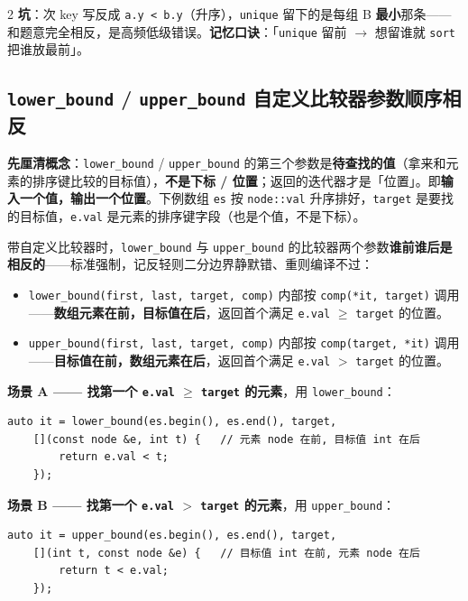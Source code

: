 \begin{multicols*}{2}
		\textbf{坑}：次 key 写反成 \texttt{a.y < b.y}（升序），\texttt{unique} 留下的是每组 B \textbf{最小}那条——和题意完全相反，是高频低级错误。\textbf{记忆口诀}：「\texttt{unique} 留前 $\to$ 想留谁就 \texttt{sort} 把谁放最前」。

		\subsection{\texttt{lower\_bound} / \texttt{upper\_bound} 自定义比较器参数顺序相反}

		\textbf{先厘清概念}：\texttt{lower\_bound} / \texttt{upper\_bound} 的第三个参数是\textbf{待查找的值}（拿来和元素的排序键比较的目标值），\textbf{不是下标 / 位置}；返回的迭代器才是「位置」。即\textbf{输入一个值，输出一个位置}。下例数组 \texttt{es} 按 \texttt{node::val} 升序排好，\texttt{target} 是要找的目标值，\texttt{e.val} 是元素的排序键字段（也是个值，不是下标）。

		带自定义比较器时，\texttt{lower\_bound} 与 \texttt{upper\_bound} 的比较器两个参数\textbf{谁前谁后是相反的}——标准强制，记反轻则二分边界静默错、重则编译不过：

		\begin{itemize}
			\item \texttt{lower\_bound(first, last, target, comp)} 内部按 \texttt{comp(*it, target)} 调用——\textbf{数组元素在前，目标值在后}，返回首个满足 \texttt{e.val} $\ge$ \texttt{target} 的位置。
			\item \texttt{upper\_bound(first, last, target, comp)} 内部按 \texttt{comp(target, *it)} 调用——\textbf{目标值在前，数组元素在后}，返回首个满足 \texttt{e.val} $>$ \texttt{target} 的位置。
		\end{itemize}

		\textbf{场景 A —— 找第一个 \texttt{e.val} $\ge$ \texttt{target} 的元素}，用 \texttt{lower\_bound}：

		\begin{verbatim}
auto it = lower_bound(es.begin(), es.end(), target,
	[](const node &e, int t) {   // 元素 node 在前, 目标值 int 在后
		return e.val < t;
	});
		\end{verbatim}

		\textbf{场景 B —— 找第一个 \texttt{e.val} $>$ \texttt{target} 的元素}，用 \texttt{upper\_bound}：

		\begin{verbatim}
auto it = upper_bound(es.begin(), es.end(), target,
	[](int t, const node &e) {   // 目标值 int 在前, 元素 node 在后
		return t < e.val;
	});
		\end{verbatim}


\end{multicols*}
